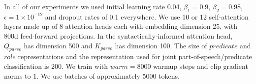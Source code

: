 \documentclass[11pt,a4paper]{article}
\newcommand{\todo}[1]{\textcolor{red}{TODO: #1}}
\begin{document}
In all of our experiments we used initial learning rate 0.04, $\beta_1=0.9$, $\beta_2=0.98$, $\epsilon=1\times10^{-12}$ and dropout rates of 0.1 everywhere. We use 10 or 12 self-attention layers made up of 8 attention heads each with embedding dimension 25, with 800d feed-forward projections. In the syntactically-informed attention head, $Q_{parse}$ has dimension 500 and $K_{parse}$ has dimension 100. The size of $predicate$ and $role$ representations and the representation used for joint part-of-speech/predicate classification is 200. We train with $warm=8000$ warmup steps and clip gradient norms to 1. We use batches of approximately 5000 tokens.
\end{document}

